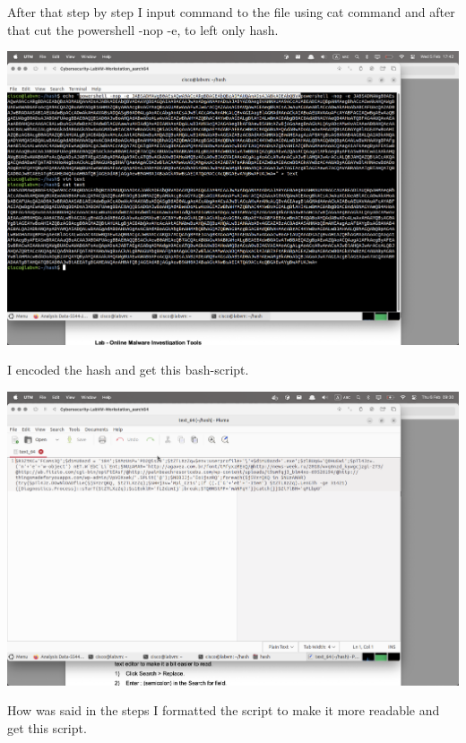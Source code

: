 \documentclass{article}
\begin{document}
\newpage

After that step by step I input command to the file using cat command and after that cut the powershell -nop -e, to left only hash.

\vspace{1\baselineskip}

\includegraphics[width=1\textwidth]{12.png}

\vspace{1\baselineskip}

I encoded the hash and get this bash-script.

\vspace{1\baselineskip}

\includegraphics[width=1\textwidth]{13.png}

\newpage

How was said in the steps I formatted the script to make it more readable and get this script.
\end{document}
